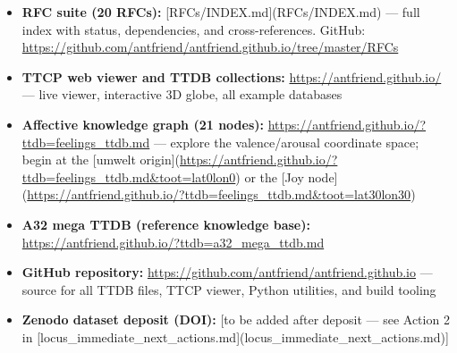 \documentclass[11pt]{article}
\begin{document}
\begin{itemize}
\item \textbf{RFC suite (20 RFCs):} [RFCs/INDEX.md](RFCs/INDEX.md) --- full index with status, dependencies, and cross-references. GitHub: \url{https://github.com/antfriend/antfriend.github.io/tree/master/RFCs}
\item \textbf{TTCP web viewer and TTDB collections:} \url{https://antfriend.github.io/} --- live viewer, interactive 3D globe, all example databases
\item \textbf{Affective knowledge graph (21 nodes):} \url{https://antfriend.github.io/?ttdb=feelings_ttdb.md} --- explore the valence/arousal coordinate space; begin at the [umwelt origin](\url{https://antfriend.github.io/?ttdb=feelings_ttdb.md&toot=lat0lon0}) or the [Joy node](\url{https://antfriend.github.io/?ttdb=feelings_ttdb.md&toot=lat30lon30})
\item \textbf{A32 mega TTDB (reference knowledge base):} \url{https://antfriend.github.io/?ttdb=a32_mega_ttdb.md}
\item \textbf{GitHub repository:} \url{https://github.com/antfriend/antfriend.github.io} --- source for all TTDB files, TTCP viewer, Python utilities, and build tooling
\item \textbf{Zenodo dataset deposit (DOI):} [to be added after deposit --- see Action 2 in [locus\_immediate\_next\_actions.md](locus\_immediate\_next\_actions.md)]

\end{itemize}
\end{document}
